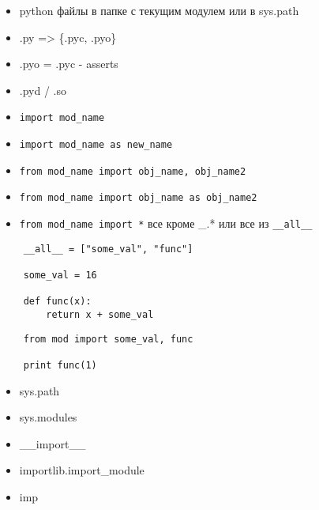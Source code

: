 \documentclass{article}
\begin{document}
\LARGE


\begin{itemize}
\item python файлы в папке с текущим модулем или в sys.path
\item .py => \{.pyc, .pyo\}
\item .pyo = .pyc - asserts
\item .pyd / .so
\item \lstinline!import mod_name!
\item \lstinline!import mod_name as new_name!
\item \lstinline!from mod_name import obj_name, obj_name2!
\item \lstinline!from mod_name import obj_name as obj_name2!
\item \lstinline!from mod_name import *! все кроме \_.* или все из \lstinline!__all__!

\end{itemize}
\newpage

{
\LARGE \vspace{15pt}
\begin{lstlisting}
	__all__ = ["some_val", "func"]
	
	some_val = 16

	def func(x):
		return x + some_val
\end{lstlisting}
}

{
\LARGE \vspace{15pt}
\begin{lstlisting}
	from mod import some_val, func

	print func(1)
\end{lstlisting}
}
\newpage

\begin{itemize}
\item sys.path
\item sys.modules
\item \_\_import\_\_
\item importlib.import\_module
\item imp
\end{itemize}
\newpage
\end{document}
